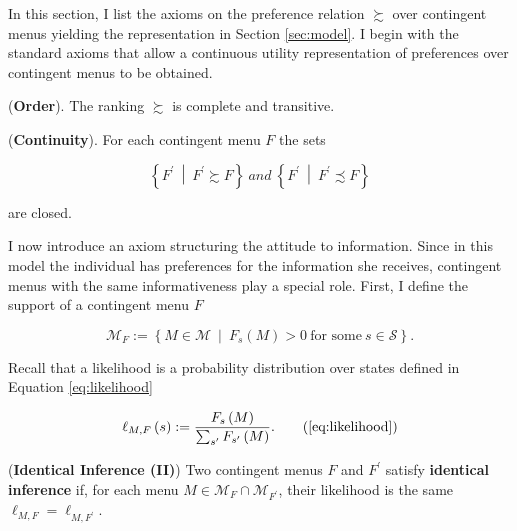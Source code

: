In this section, I list the axioms on the preference relation \(\succsim\) over contingent menus yielding the representation in Section \ref{sec:model}. I begin with the standard axioms that allow a continuous utility representation of preferences over contingent menus to be obtained.

\begin{axiom}\label{ax:order}
	 (\textbf{Order}). The ranking \(\succsim\) is complete and transitive.

\end{axiom}

\begin{axiom}\label{ax:continuity}

	(\textbf{Continuity}). For each contingent menu \( F \) the sets

	\[
		\left\{ F^{\prime} \: \middle\vert  \:  F^{\prime} \succsim F \right\} \: and \: \left\{ F^{\prime} \: \middle\vert  \:  F^{\prime} \precsim F \right\}
	\]

	are closed.

\end{axiom}

I now introduce an axiom structuring the attitude to information. Since in this model the individual has preferences for the information she receives, contingent menus with the same informativeness play a special role. First, I define the support of a contingent menu \( F \)

\[
	\mathcal{M}_{F} := \left\{ M \in \mathcal{M} \: \middle\vert \: F_{s} \left( M \right) > 0 \: \text{for some} \: s \in \mathcal{S} \right\} .
\]

Recall that a likelihood is a probability distribution over states defined in Equation \eqref{eq:likelihood}

\begin{equation}
	\ell_{M, F} \left( s \right) : = \frac{F_{s} \left( M \right)}{ \sum_{s^{\prime}} F_{s^{\prime}} \left( M \right)} . \tag{\ref{eq:likelihood}}
\end{equation}

\begin{definition}\label{def:ii}

	(\textbf{Identical Inference (II)})
	Two contingent menus \(F\) and \(F^{\prime}\) satisfy \textbf{identical inference} if, for each menu \(M \in \mathcal{M}_{F} \cap \mathcal{M}_{F^{\prime}}\), their likelihood is the same \(\ell_{M, F} = \ell_{M, F^{\prime}} \).

\end{definition}

